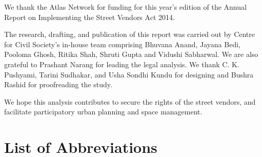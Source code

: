 \documentclass[a4paper, 12pt, twoside]{article}
\begin{document}
We thank the Atlas Network for funding for this year’s edition of the Annual Report on Implementing the Street Vendors Act 2014.

The research, drafting, and publication of this report was carried out by Centre for Civil Society’s in-house team comprising Bhuvana Anand, Jayana Bedi, Pooloma Ghosh, Ritika Shah, Shruti Gupta and Vidushi Sabharwal. We are also grateful to Prashant Narang for leading the legal analysis. We thank C. K. Pushyami, Tarini Sudhakar, and Usha Sondhi Kundu for designing and Bushra Rashid for proofreading the study.

We hope this analysis contributes to secure the rights of the street vendors, and facilitate participatory urban planning and space management.
\newpage
\tableofcontents

\newpage
{}

\section*{List of Abbreviations}
\end{document}
